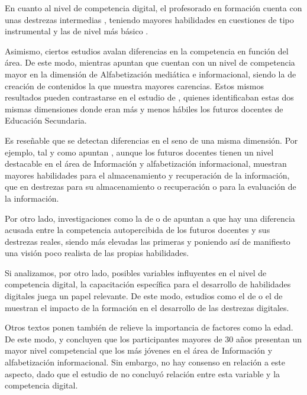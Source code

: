 \documentclass[spanish]{textolivre}
\begin{document}
En cuanto al nivel de competencia digital, el profesorado en formación cuenta con unas destrezas intermedias \cite{rodriguezmartin2016estudio}, teniendo mayores habilidades en cuestiones de tipo instrumental y las de nivel más básico \cite{napal_fraile_development_2018}.

Asimismo, ciertos estudios avalan diferencias en la competencia en función del área. De este modo, mientras \textcite{marin_suelves_alisis_2022} apuntan que cuentan con un nivel de competencia mayor en la dimensión de Alfabetización mediática e informacional, siendo la de creación de contenidos la que muestra mayores carencias. Estos mismos resultados pueden contrastarse en el estudio de \textcite{torres2020competencia}, quienes identificaban estas dos mismas dimensiones donde eran más y menos hábiles los futuros docentes de Educación Secundaria.

Es reseñable que se detectan diferencias en el seno de una misma dimensión. Por ejemplo, tal y como apuntan \textcite{moreno_guerrero_competencia_2020}, aunque los futuros docentes tienen un nivel destacable en el área de Información y alfabetización informacional, muestran mayores habilidades para el almacenamiento y recuperación de la información, que en destrezas para su almacenamiento o recuperación o para la evaluación de la información.

Por otro lado, investigaciones como la de \textcite{nieto-isidro_competencia_2022} o de \textcite{gende2021variacion} apuntan a que hay una diferencia acusada entre la competencia autopercibida de los futuros docentes y sus destrezas reales, siendo más elevadas las primeras y poniendo así de manifiesto una visión poco realista de las propias habilidades.

Si analizamos, por otro lado, posibles variables influyentes en el nivel de competencia digital, la capacitación específica para el desarrollo de habilidades digitales juega un papel relevante. De este modo, estudios como el de \textcite{jimenez-hernandez_mejora_2021} o el de \textcite{moreno_martinez_experiencia_2016} muestran el impacto de la formación en el desarrollo de las destrezas digitales.

Otros textos ponen también de relieve la importancia de factores como la edad. De este modo, \textcite{moreno-guerrero_area_2020} y \textcite{perez-navio_university_2021} concluyen que los participantes mayores de 30 años presentan un mayor nivel competencial que los más jóvenes en el área de Información y alfabetización informacional. Sin embargo, no hay consenso en relación a este aspecto, dado que el estudio de \textcite{jimenez-hernandez_mejora_2021} no concluyó relación entre esta variable y la competencia digital.
\end{document}
